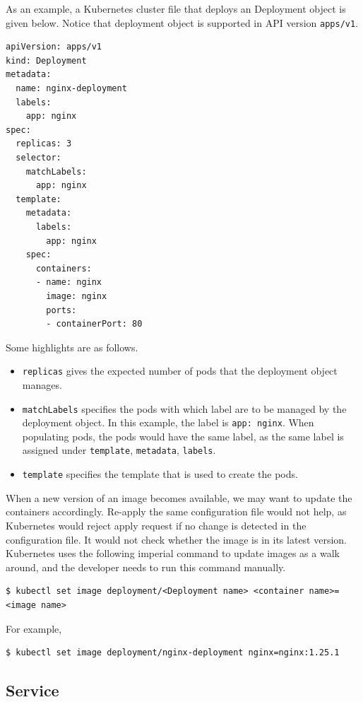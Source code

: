 As an example, a Kubernetes cluster file that deploys an Deployment object is given below. Notice that deployment object is supported in API version \verb|apps/v1|.
\begin{lstlisting}
apiVersion: apps/v1
kind: Deployment
metadata:
  name: nginx-deployment
  labels:
    app: nginx
spec:
  replicas: 3
  selector:
    matchLabels:
      app: nginx
  template:
    metadata:
      labels:
        app: nginx
    spec:
      containers:
      - name: nginx
        image: nginx
        ports:
        - containerPort: 80

\end{lstlisting}
Some highlights are as follows.
\begin{itemize}
	\item \verb|replicas| gives the expected number of pods that the deployment object manages.
	\item \verb|matchLabels| specifies the pods with which label are to be managed by the deployment object. In this example, the label is \verb|app: nginx|. When populating pods, the pods would have the same label, as the same label is assigned under \verb|template|, \verb|metadata|, \verb|labels|.
	\item \verb|template| specifies the template that is used to create the pods.
\end{itemize}

When a new version of an image becomes available, we may want to update the containers accordingly. Re-apply the same configuration file would not help, as Kubernetes would reject apply request if no change is detected in the configuration file. It would not check whether the image is in its latest version. Kubernetes uses the following imperial command to update images as a walk around, and the developer needs to run this command manually.
\begin{lstlisting}
$ kubectl set image deployment/<Deployment name> <container name>=<image name>
\end{lstlisting}
For example,
\begin{lstlisting}
$ kubectl set image deployment/nginx-deployment nginx=nginx:1.25.1
\end{lstlisting}

\subsection{Service} \label{ch:vac:subsec:k8snetworking}

